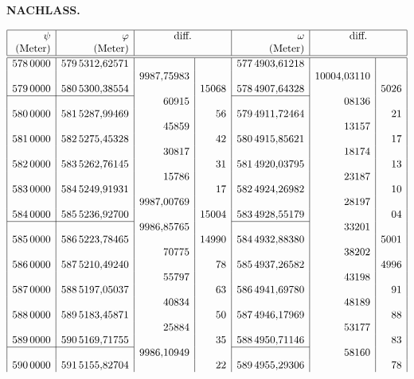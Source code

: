 \par\clearpage
{}\hfill{\small\textbf{NACHLASS.}}\hfill\null\par\medskip
{\small\renewcommand{\arraystretch}{.82}
\[\begin{array}{|r|r|r|r|r|r|r|}\hline
\psi&\varphi&\multicolumn{2}{c|}{\text{diff.}}&\omega&\multicolumn{2}{c|}{\text{diff.}}\\
\text{(Meter)}&\text{(Meter)}&\multicolumn{2}{c|}{}&\text{(Meter)}&\multicolumn{2}{c|}{}\\\hline\hline
578\,0000&579\,5312{,}62571&&&577\,4903{,}61218&&\\
&&9987{,}75983&&&10004{,}03110&\\
579\,0000&580\,5300{,}38554&&15068&578\,4907{,}64328&&5026\\
\cline{1-2}\cline{5-5}
&&60915&&&08136&\\
580\,0000&581\,5287{,}99469&&56&579\,4911{,}72464&&21\\
&&45859&&&13157&\\
581\,0000&582\,5275{,}45328&&42&580\,4915{,}85621&&17\\
&&30817&&&18174&\\
582\,0000&583\,5262{,}76145&&31&581\,4920{,}03795&&13\\
&&15786&&&23187&\\
583\,0000&584\,5249{,}91931&&17&582\,4924{,}26982&&10\\
&&9987{,}00769&&&28197&\\
584\,0000&585\,5236{,}92700&&15004&583\,4928{,}55179&&04\\
\cline{1-2}\cline{5-5}
&&9986{,}85765&&&33201&\\
585\,0000&586\,5223{,}78465&&14990&584\,4932{,}88380&&5001\\
&&70775&&&38202&\\
586\,0000&587\,5210{,}49240&&78&585\,4937{,}26582&&4996\\
&&55797&&&43198&\\
587\,0000&588\,5197{,}05037&&63&586\,4941{,}69780&&91\\
&&40834&&&48189&\\
588\,0000&589\,5183{,}45871&&50&587\,4946{,}17969&&88\\
&&25884&&&53177&\\
589\,0000&590\,5169{,}71755&&35&588\,4950{,}71146&&83\\
\cline{1-2}\cline{5-5}
&&9986{,}10949&&&58160&\\
590\,0000&591\,5155{,}82704&&22&589\,4955{,}29306&&78\\

\end{array}\]}
